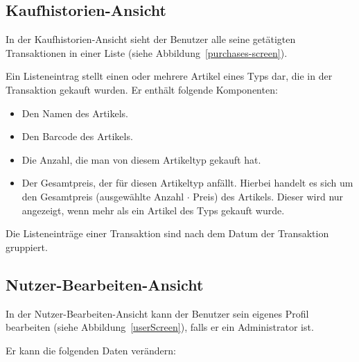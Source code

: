 
\subsection{Kaufhistorien-Ansicht} \label{subsec:purchases-screen}

In der Kaufhistorien-Ansicht sieht der Benutzer alle seine getätigten Transaktionen in einer Liste (siehe Abbildung~\ref{purchases-screen}).

Ein Listeneintrag stellt einen oder mehrere Artikel eines Typs dar, die in der Transaktion gekauft wurden.
Er enthält folgende Komponenten:

\begin{itemize}
	\item Den Namen des Artikels.

	\item Den Barcode des Artikels.

	\item Die Anzahl, die man von diesem Artikeltyp gekauft hat.

	\item Der Gesamtpreis, der für diesen Artikeltyp anfällt.
	Hierbei handelt es sich um den Gesamtpreis (ausgewählte Anzahl $\cdot$ Preis) des Artikels.
	Dieser wird nur angezeigt, wenn mehr als ein Artikel des Typs gekauft wurde.
\end{itemize}

Die Listeneinträge einer Transaktion sind nach dem Datum der Transaktion gruppiert.


\subsection{Nutzer-Bearbeiten-Ansicht} \label{subsec:edit-user-screen}

In der Nutzer-Bearbeiten-Ansicht kann der Benutzer sein eigenes Profil bearbeiten (siehe Abbildung~\ref{userScreen}), falls er ein Administrator ist.


Er kann die folgenden Daten verändern:

